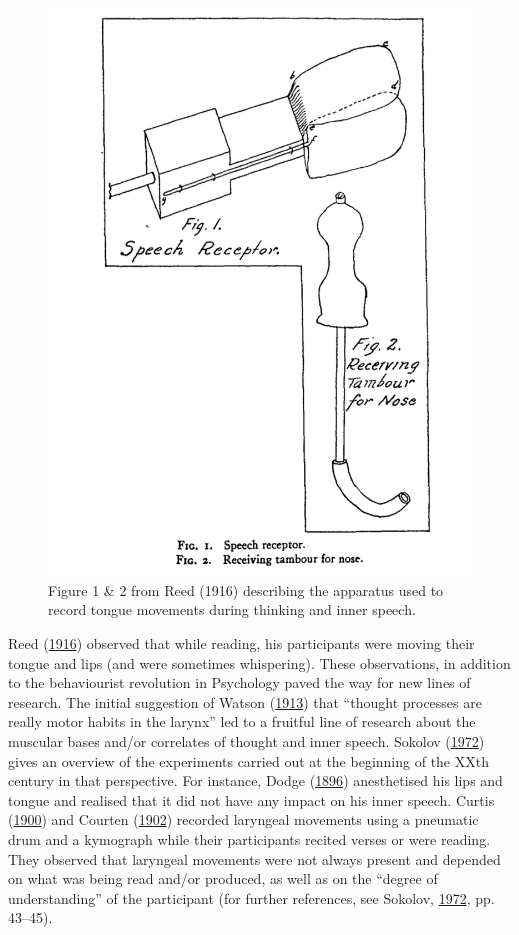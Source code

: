 \documentclass[a4paper,12pt,twoside,onecolumn,openright,final,oldfontcommands]{memoir}
\begin{document}
\begin{figure}[ht]

{\centering \includegraphics[width=0.5\linewidth]{assets/reed} 

}

\caption{Figure 1 \& 2 from Reed (1916) describing the apparatus used to record tongue movements during thinking and inner speech.}\label{fig:reed}
\end{figure}

Reed (\protect\hyperlink{ref-reed_existence_1916}{1916}) observed that while reading, his participants were moving their tongue and lips (and were sometimes whispering). These observations, in addition to the behaviourist revolution in Psychology paved the way for new lines of research. The initial suggestion of Watson (\protect\hyperlink{ref-watson_psychology_1913}{1913}) that \enquote{thought processes are really motor habits in the larynx} led to a fruitful line of research about the muscular bases and/or correlates of thought and inner speech. Sokolov (\protect\hyperlink{ref-sokolov_inner_1972}{1972}) gives an overview of the experiments carried out at the beginning of the XXth century in that perspective. For instance, Dodge (\protect\hyperlink{ref-dodge_motorischen_1896}{1896}) anesthetised his lips and tongue and realised that it did not have any impact on his inner speech. Curtis (\protect\hyperlink{ref-curtis_automatic_1900}{1900}) and Courten (\protect\hyperlink{ref-courten_involuntary_1902}{1902}) recorded laryngeal movements using a pneumatic drum and a kymograph while their participants recited verses or were reading. They observed that laryngeal movements were not always present and depended on what was being read and/or produced, as well as on the \enquote{degree of understanding} of the participant (for further references, see Sokolov, \protect\hyperlink{ref-sokolov_inner_1972}{1972}, pp. 43--45).
\end{document}
